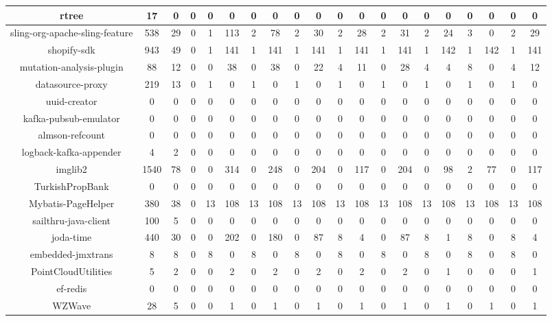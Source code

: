 \begin{table}
\begin{tabular}{|c|c|c|c|c|c|c|c|c|c|c|c|c|c|c|c|c|c|c|c|}
\hline
rtree & 17 & 0 & 0 & 0 & 0 & 0 & 0 & 0 & 0 & 0 & 0 & 0 & 0 & 0 & 0 & 0 & 0 & 0 & 0 \\
\hline
sling-org-apache-sling-feature & 538 & 29 & 0 & 1 & 113 & 2 & 78 & 2 & 30 & 2 & 28 & 2 & 31 & 2 & 24 & 3 & 0 & 2 & 29 \\
\hline
shopify-sdk & 943 & 49 & 0 & 1 & 141 & 1 & 141 & 1 & 141 & 1 & 141 & 1 & 141 & 1 & 142 & 1 & 142 & 1 & 141 \\
\hline
mutation-analysis-plugin & 88 & 12 & 0 & 0 & 38 & 0 & 38 & 0 & 22 & 4 & 11 & 0 & 28 & 4 & 4 & 8 & 0 & 4 & 12 \\
\hline
datasource-proxy & 219 & 13 & 0 & 1 & 0 & 1 & 0 & 1 & 0 & 1 & 0 & 1 & 0 & 1 & 0 & 1 & 0 & 1 & 0 \\
\hline
uuid-creator & 0 & 0 & 0 & 0 & 0 & 0 & 0 & 0 & 0 & 0 & 0 & 0 & 0 & 0 & 0 & 0 & 0 & 0 & 0 \\
\hline
kafka-pubsub-emulator & 0 & 0 & 0 & 0 & 0 & 0 & 0 & 0 & 0 & 0 & 0 & 0 & 0 & 0 & 0 & 0 & 0 & 0 & 0 \\
\hline
almson-refcount & 0 & 0 & 0 & 0 & 0 & 0 & 0 & 0 & 0 & 0 & 0 & 0 & 0 & 0 & 0 & 0 & 0 & 0 & 0 \\
\hline
logback-kafka-appender & 4 & 2 & 0 & 0 & 0 & 0 & 0 & 0 & 0 & 0 & 0 & 0 & 0 & 0 & 0 & 0 & 0 & 0 & 0 \\
\hline
imglib2 & 1540 & 78 & 0 & 0 & 314 & 0 & 248 & 0 & 204 & 0 & 117 & 0 & 204 & 0 & 98 & 2 & 77 & 0 & 117 \\
\hline
TurkishPropBank & 0 & 0 & 0 & 0 & 0 & 0 & 0 & 0 & 0 & 0 & 0 & 0 & 0 & 0 & 0 & 0 & 0 & 0 & 0 \\
\hline
Mybatis-PageHelper & 380 & 38 & 0 & 13 & 108 & 13 & 108 & 13 & 108 & 13 & 108 & 13 & 108 & 13 & 108 & 13 & 108 & 13 & 108 \\
\hline
sailthru-java-client & 100 & 5 & 0 & 0 & 0 & 0 & 0 & 0 & 0 & 0 & 0 & 0 & 0 & 0 & 0 & 0 & 0 & 0 & 0 \\
\hline
joda-time & 440 & 30 & 0 & 0 & 202 & 0 & 180 & 0 & 87 & 8 & 4 & 0 & 87 & 8 & 1 & 8 & 0 & 8 & 4 \\
\hline
embedded-jmxtrans & 8 & 8 & 0 & 8 & 0 & 8 & 0 & 8 & 0 & 8 & 0 & 8 & 0 & 8 & 0 & 8 & 0 & 8 & 0 \\
\hline
PointCloudUtilities & 5 & 2 & 0 & 0 & 2 & 0 & 2 & 0 & 2 & 0 & 2 & 0 & 2 & 0 & 1 & 0 & 0 & 0 & 1 \\
\hline
ef-redis & 0 & 0 & 0 & 0 & 0 & 0 & 0 & 0 & 0 & 0 & 0 & 0 & 0 & 0 & 0 & 0 & 0 & 0 & 0 \\
\hline
WZWave & 28 & 5 & 0 & 0 & 1 & 0 & 1 & 0 & 1 & 0 & 1 & 0 & 1 & 0 & 1 & 0 & 1 & 0 & 1 \\

\end{tabular}
\end{table}
